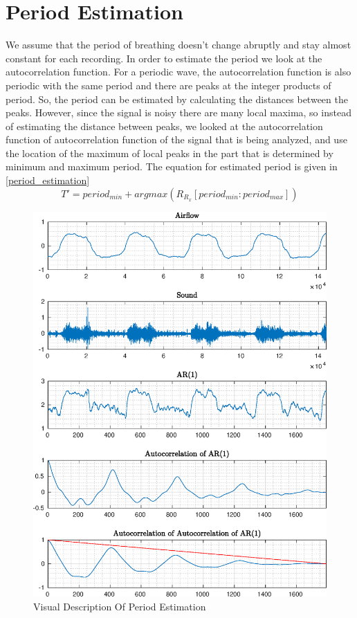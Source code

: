 \section{Period Estimation}
We assume that the period of breathing doesn't change abruptly and stay almost constant for each recording. In order to estimate the period we look at the autocorrelation function. For a periodic wave, the autocorrelation function is also periodic with the same period and there are peaks at the integer products of period. So, the period can be estimated by calculating the distances between the peaks. However, since the signal is noisy there are many local maxima, so instead of estimating the distance between peaks, we looked at the autocorrelation function of autocorrelation function of the signal that is being analyzed, and use the location of the maximum of local peaks in the part that is determined by minimum and maximum period. The equation for estimated period is given in \eqref{period_estimation}
\begin{equation}
T' = period_{min} + argmax(R_{R_{x}}[period_{min}:period_{max}])
\label{period_estimation}
\end{equation}
\begin{figure}
	\begin{center}
		\includegraphics[width=\textwidth]{figures/find_period_ins_exp.eps}
		\caption{Visual Description Of Period Estimation}
		\label{fig:estimate_period}
	\end{center}
\end{figure}
